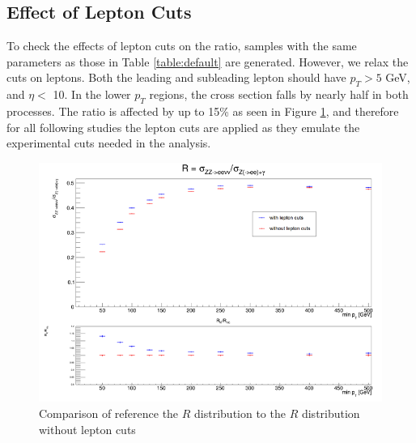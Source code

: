 \documentclass[11pt,a4paper]{report}
\begin{document}
\subsection{Effect of Lepton Cuts}
To check the effects of lepton cuts on the ratio, samples with the same parameters as those in Table \ref{table:default} are generated. However, we relax the cuts on leptons. Both the leading and subleading lepton should have $p_T > 5$ GeV, and $\eta <$ 10. In the lower $p_T$ regions, the cross section falls by nearly half in both processes. The ratio is affected by up to 15\% as seen in Figure \ref{fig:lepcut}, and therefore for all following studies the lepton cuts are applied as they emulate the experimental cuts needed in the analysis.
\begin{figure}[H]
\centering
	\includegraphics[width = 0.8\linewidth]{lep_cuts.png}
	\caption{Comparison of reference the $R$ distribution to the $R$ distribution without lepton cuts}
	\label{fig:lepcut}
\end{figure}
\end{document}
